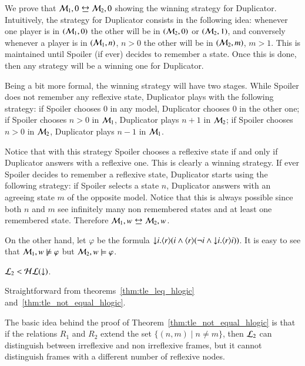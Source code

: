 \begin{pf}
We prove that $\model_1,0\bisim\model_2,0$ showing the winning
strategy for Duplicator. Intuitively, the strategy for Duplicator
consists in the following idea: whenever one player is in
$(\mathcal{M}_1,0)$ the other will be in $(\mathcal{M}_2,0)$ or
$(\mathcal{M}_2,1)$, and conversely whenever a player is in
$(\mathcal{M}_1,n)$, $n>0$ the other will be in $(\mathcal{M}_2,m)$, $m>1$.
This is maintained until Spoiler (if ever) decides to remember a
state. Once this is done, then any strategy will be a winning one
for Duplicator.


Being a bit more formal, the winning strategy will have two stages. While Spoiler does not remember any reflexive
state, Duplicator plays with the following strategy: if Spoiler
chooses $0$ in any model, Duplicator chooses $0$ in the other one;
if Spoiler chooses $n>0$ in $\mathcal{M}_1$, Duplicator plays $n+1$ in
$\mathcal{M}_2$; if Spoiler chooses $n>0$ in $\mathcal{M}_2$, Duplicator plays
$n-1$ in $\mathcal{M}_1$.

Notice that with this strategy Spoiler chooses
a reflexive state if and only if Duplicator answers with a reflexive
one. This is clearly a winning strategy. If ever Spoiler decides to
remember a reflexive state, Duplicator starts using the following
strategy: if Spoiler selects a state $n$, Duplicator answers with an
agreeing state $m$ of the opposite model. Notice that this is always
possible since both $n$ and $m$ see infinitely many non remembered
states and at least one remembered state. Therefore $\model_1,w \bisim \model_2, w$.

On the other hand, let $\varphi$ be the formula ${\downarrow} i. \langle r \rangle(i
\land \langle r \rangle(\lnot i \land {\downarrow} i.\langle r \rangle i))$. It is easy to see
that $\mathcal{M}_1, w \not \models \varphi$ but $\mathcal{M}_2, w \models
\varphi$.
\end{pf}

\begin{cor}
$\mathcal{L}_2<\mathcal{HL}({\downarrow})$.
\end{cor}

\begin{pf}
Straightforward from theorems~\ref{thm:tle_leq_hlogic}
and~\ref{thm:tle_not_equal_hlogic}.
\end{pf}

The basic idea behind the proof of
Theorem~\ref{thm:tle_not_equal_hlogic} is that if the relations
$R_1$ and $R_2$ extend the set $\{(n,m) \mid n\not= m\}$, then
$\mathcal{L}_2$ can distinguish between irreflexive and non irreflexive
frames, but it cannot distinguish frames with a different number of
reflexive nodes.

